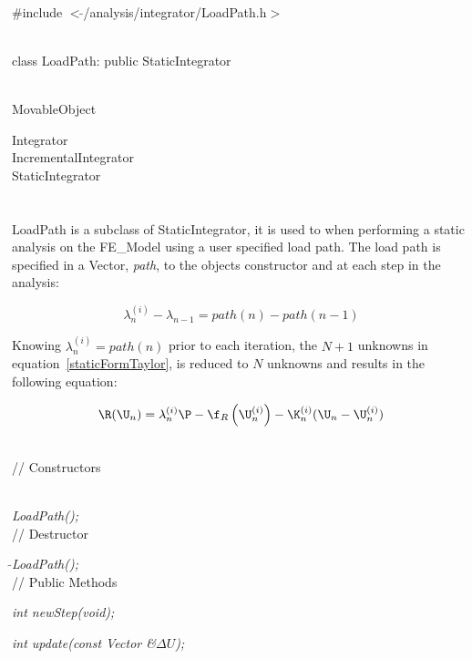 
   \\
\#include $<\tilde{ }$/analysis/integrator/LoadPath.h$>$  


  \\
class LoadPath: public StaticIntegrator  


 \\
MovableObject 

\indent\indent Integrator \\
\indent\indent\indent IncrementalIntegrator \\
\indent\indent\indent\indent StaticIntegrator \\
\indent\indent\indent\indent{} \\

 \\ 
\indent LoadPath is a subclass of StaticIntegrator, it is
used to when performing a static analysis on the FE\_Model using a
user specified load path. The load path is specified in a Vector, {\em
path}, to the objects constructor and at each step in the analysis:

\[ 
\lambda_n^{(i)} - \lambda_{n-1} = path(n) - path(n-1)
\]

Knowing $\lambda_n^{(i)} = path(n)$ prior to each iteration, the $N+1$
unknowns in equation~\ref{staticFormTaylor}, is reduced to $N$ unknowns and
results in the following equation:

\begin{equation} 
\R(\U_{n}) = \lambda_n^{(i)} \P 
 - \f_{R}\left(\U_{n}^{(i)} \right) - 
\K_n^{(i)} 
(\U_{n} - \U_{n}^{(i)})  
\label{staticFormLoadPath}
\end{equation} 

 \\
// Constructors 

\\ 
{\em LoadPath();}\\ 

// Destructor 

{\em $\tilde{ }$LoadPath();}\\  

// Public Methods 

{\em int newStep(void);} 

{\em int update(const Vector \&$\Delta U$);} \\ 

